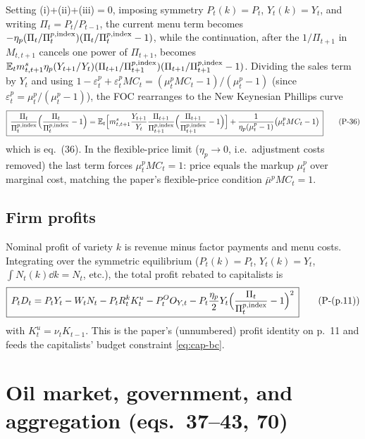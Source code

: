 Setting (i)+(ii)+(iii)$=0$, imposing symmetry $P_t(k)=P_t$, $Y_t(k)=Y_t$, and writing
$\Pi_t=P_t/P_{t-1}$, the current menu term becomes
$-\eta_p(\Pi_t/\Pi^{p,\text{index}}_t)(\Pi_t/\Pi^{p,\text{index}}_t-1)$, while the continuation, after the
$1/\Pi_{t+1}$ in $M_{t,t+1}$ cancels one power of $\Pi_{t+1}$, becomes
$\mathbb{E}_t m^s_{t,t+1}\eta_p(Y_{t+1}/Y_t)(\Pi_{t+1}/\Pi^{p,\text{index}}_{t+1})(\Pi_{t+1}/\Pi^{p,\text{index}}_{t+1}-1)$.
Dividing the sales term by $Y_t$ and using
$1-\varepsilon^p_t+\varepsilon^p_tMC_t=(\mu^p_tMC_t-1)/(\mu^p_t-1)$ (since
$\varepsilon^p_t=\mu^p_t/(\mu^p_t-1)$), the FOC rearranges to the New Keynesian Phillips curve
\begin{equation}\label{eq:36}
\boxed{\,\frac{\Pi_t}{\Pi^{p,\text{index}}_t}\Big(\frac{\Pi_t}{\Pi^{p,\text{index}}_t}-1\Big)
=\mathbb{E}_t\Big[m^s_{t,t+1}\frac{Y_{t+1}}{Y_t}\frac{\Pi_{t+1}}{\Pi^{p,\text{index}}_{t+1}}
\Big(\frac{\Pi_{t+1}}{\Pi^{p,\text{index}}_{t+1}}-1\Big)\Big]+\frac{1}{\eta_p(\mu^p_t-1)}\big(\mu^p_tMC_t-1\big)\,}
\tag{P-36}
\end{equation}
which is eq.\ (36). In the flexible-price limit ($\eta_p\to0$, i.e.\ adjustment costs removed)
the last term forces $\mu^p_tMC_t=1$: price equals the markup $\mu^p_t$ over marginal cost, matching
the paper's flexible-price condition $\bar\mu^pMC_t=1$.

\subsection{Firm profits}
Nominal profit of variety $k$ is revenue minus factor payments and menu costs. Integrating over the
symmetric equilibrium ($P_t(k)=P_t$, $Y_t(k)=Y_t$, $\int N_t(k)\dd k=N_t$, etc.), the total profit
rebated to capitalists is
\begin{equation}\label{eq:profits}
\boxed{\,P_tD_t=P_tY_t-W_tN_t-P_tR^k_tK^u_t-P^O_tO_{Y,t}-P_t\frac{\eta_p}{2}Y_t\Big(\frac{\Pi_t}{\Pi^{p,\text{index}}_t}-1\Big)^2\,}
\tag{P-(p.11)}
\end{equation}
with $K^u_t=\nu_tK_{t-1}$. This is the paper's (unnumbered) profit identity on p.\ 11 and feeds the
capitalists' budget constraint \eqref{eq:cap-bc}.

\section{Oil market, government, and aggregation (eqs.\ 37--43, 70)}\label{sec:agg}

